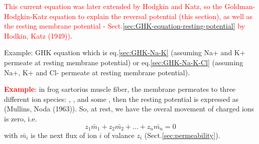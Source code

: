 \textcolor{red}{This current equation was later extended by Hodgkin and Katz, so
the Goldman-Hodgkin-Katz equation to explain the reversal potential (this section),
as well as the resting membrane potential -
Sect.\ref{sec:GHK-equation-resting-potential} by Hodkin, Katz (1949))}.

Example: GHK equation which is eq.\ref{sec:GHK-Na-K} (assuming Na+ and K+
permeate at resting membrane potential) or eq.\ref{sec:GHK-Na-K-Cl} (assuming
Na+, K+ and Cl- permeate at resting membrane potential).




\textcolor{red}{\bf Example}: in frog sartorius muscle fiber, the membrane
permeates to three different ion species: , , and some , then the resting
potential is expressed as (Mullins, Noda (1963)). So, at rest, we have the
overal movement of charged ions is zero, i.e.
\begin{equation}
z_1 \bar{m}_1 + z_2 \bar{m_2} + \ldots + z_n \bar{m_n} = 0
\end{equation}
with $\bar{m_i}$ is the next flux of ion $i$ of valance $z_i$
(Sect.\ref{sec:permeability}).  

